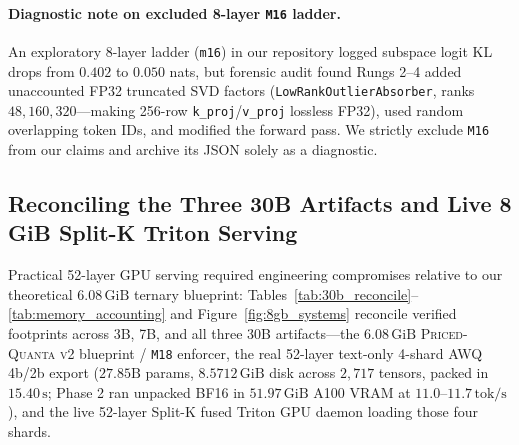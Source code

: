 \documentclass[10pt]{article} %
\newcommand{\pqv}{\textsc{Priced-Quanta v2}}
\begin{document}
\paragraph{Diagnostic note on excluded 8-layer \texttt{M16} ladder.}
An exploratory 8-layer ladder (\texttt{m16}) in our repository logged subspace logit KL drops from $0.402$ to $0.050$ nats, but forensic audit found Rungs 2--4 added unaccounted FP32 truncated SVD factors (\texttt{LowRankOutlierAbsorber}, ranks $48, 160, 320$---making 256-row \texttt{k\_proj}/\texttt{v\_proj} lossless FP32), used random overlapping token IDs, and modified the forward pass. We strictly exclude \texttt{M16} from our claims and archive its JSON solely as a diagnostic.

\subsection{Reconciling the Three 30B Artifacts and Live 8 GiB Split-K Triton Serving}
\label{sec:30b_serving}

Practical 52-layer GPU serving required engineering compromises relative to our theoretical $6.08\,\text{GiB}$ ternary blueprint: Tables~\ref{tab:30b_reconcile}--\ref{tab:memory_accounting} and Figure~\ref{fig:8gb_systems} reconcile verified footprints across 3B, 7B, and all three 30B artifacts---the $6.08\,\text{GiB}$ \pqv{} blueprint / \texttt{M18} enforcer, the real 52-layer text-only 4-shard AWQ 4b/2b export ($27.85\text{B}$ params, $8.5712\,\text{GiB}$ disk across $2{,}717$ tensors, packed in $15.40\,\text{s}$; Phase 2 ran unpacked BF16 in $51.97\,\text{GiB}$ A100 VRAM at $11.0$--$11.7\,\text{tok/s}$), and the live 52-layer Split-K fused Triton GPU daemon loading those four shards.
\end{document}
